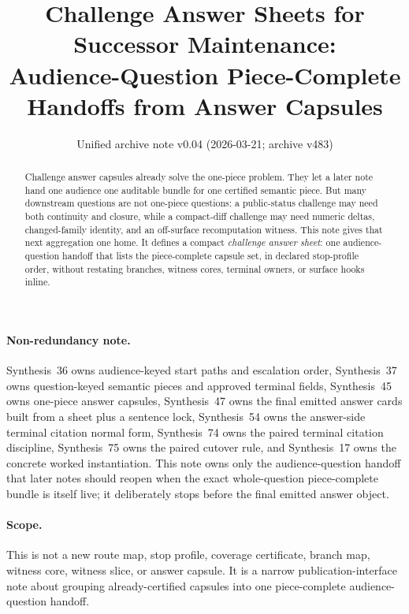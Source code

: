 \documentclass[11pt]{article}
\title{Challenge Answer Sheets for Successor Maintenance:\\[0.5ex]
\large Audience-Question Piece-Complete Handoffs from Answer Capsules}
\author{}
\date{Unified archive note v0.04 (2026-03-21; archive v483)}
\begin{document}
\maketitle

\begin{abstract}
Challenge answer capsules already solve the one-piece problem.
They let a later note hand one audience one auditable bundle for one certified semantic piece.
But many downstream questions are not one-piece questions: a public-status challenge may need both continuity and closure, while a compact-diff challenge may need numeric deltas, changed-family identity, and an off-surface recomputation witness.
This note gives that next aggregation one home.
It defines a compact \emph{challenge answer sheet}: one audience-question handoff that lists the piece-complete capsule set, in declared stop-profile order, without restating branches, witness cores, terminal owners, or surface hooks inline.
\end{abstract}

\paragraph{Non-redundancy note.}
Synthesis~36 owns audience-keyed start paths and escalation order, Synthesis~37 owns question-keyed semantic pieces and approved terminal fields, Synthesis~45 owns one-piece answer capsules, Synthesis~47 owns the final emitted answer cards built from a sheet plus a sentence lock, Synthesis~54 owns the answer-side terminal citation normal form, Synthesis~74 owns the paired terminal citation discipline, Synthesis~75 owns the paired cutover rule, and Synthesis~17 owns the concrete worked instantiation.
This note owns only the audience-question handoff that later notes should reopen when the exact whole-question piece-complete bundle is itself live; it deliberately stops before the final emitted answer object.

\paragraph{Scope.}
This is not a new route map, stop profile, coverage certificate, branch map, witness core, witness slice, or answer capsule.
It is a narrow publication-interface note about grouping already-certified capsules into one piece-complete audience-question handoff.
\end{document}
